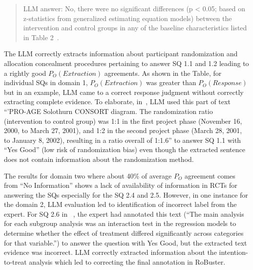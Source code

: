 \documentclass[sn-mathphys,Numbered]{sn-jnl}%
\theoremstyle{thmstyleone}%
\theoremstyle{thmstyletwo}%
\theoremstyle{thmstylethree}%
\begin{document}
\begin{quote}
    LLM answer: No, there were no significant differences (p < 0.05; based on z-statistics from generalized estimating equation models) between the intervention and control groups in any of the baseline characteristics listed in Table 2~\cite{stuck2015effect}.
\end{quote}

The LLM correctly extracts information about participant randomization and allocation concealment procedures pertaining to answer SQ 1.1 and 1.2 leading to a rightly good $P_{O} (Extraction)$ agreements. 
As shown in the Table, for individual SQs in domain 1, $P_{O} (Extraction)$ was greater than $P_{O} (Response)$ but in an example, LLM came to a correct response judgment without correctly extracting complete evidence.
To elaborate, in~\cite{stuck2015effect}, LLM used this part of text ``'PRO-AGE Solothurn CONSORT diagram. The randomization ratio (intervention to control group) was 1:1 in the first project phase (November 16, 2000, to March 27, 2001), and 1:2 in the second project phase (March 28, 2001, to January 8, 2002), resulting in a ratio overall of 1:1.6'' to answer SQ 1.1 with ``Yes Good'' (low risk of randomization bias) even though the extracted sentence does not contain information about the randomization method.


The results for domain two where about 40\% of average $P_{O}$ agreement comes from ``No Information'' shows a lack of availability of information in RCTs for answering the SQs especially for the SQ 2.4 and 2.5.
However, in one instance for the domain 2, LLM evaluation led to identification of incorrect label from the expert. 
For SQ 2.6 in ~\cite{hassett2020digitally}, the expert had annotated this text (``The main analysis for each subgroup analysis was an interaction test in the regression models to determine whether the effect of treatment differed significantly across categories for that variable.'') to answer the question with Yes Good, but the extracted text evidence was incorrect.
LLM correctly extracted information about the intention-to-treat analysis which led to correcting the final annotation in RoBuster.
\end{document}
